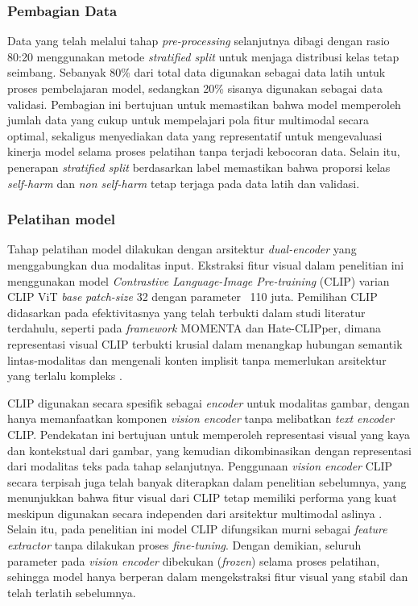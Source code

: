 \subsubsection{Pembagian Data} \label{subsubsec:pembagian_data}
Data yang telah melalui tahap \textit{pre-processing} selanjutnya dibagi dengan rasio 80:20 menggunakan metode \textit{stratified split} untuk menjaga distribusi kelas tetap seimbang. Sebanyak 80\% dari total data digunakan sebagai data latih untuk proses pembelajaran model, sedangkan 20\% sisanya digunakan sebagai data validasi. Pembagian ini bertujuan untuk memastikan bahwa model memperoleh jumlah data yang cukup untuk mempelajari pola fitur multimodal secara optimal, sekaligus menyediakan data yang representatif untuk mengevaluasi kinerja model selama proses pelatihan tanpa terjadi kebocoran data. Selain itu, penerapan \textit{stratified split} berdasarkan label memastikan bahwa proporsi kelas \textit{self-harm} dan \textit{non self-harm} tetap terjaga pada data latih dan validasi.

\subsubsection{Pelatihan model} \label{subsubsec:pelatihan_model}
Tahap pelatihan model dilakukan dengan arsitektur \textit{dual-encoder} yang menggabungkan dua modalitas input. Ekstraksi fitur visual dalam penelitian ini menggunakan model \textit{Contrastive Language-Image Pre-training} (CLIP) varian CLIP ViT \textit{base} \textit{patch-size} 32 dengan parameter ~110 juta. Pemilihan CLIP didasarkan pada efektivitasnya yang telah terbukti dalam studi literatur terdahulu, seperti pada \textit{framework} MOMENTA dan Hate-CLIPper, dimana representasi visual CLIP terbukti krusial dalam menangkap hubungan semantik lintas-modalitas dan mengenali konten implisit tanpa memerlukan arsitektur yang terlalu kompleks \cite{pramanick2021momenta} \cite{kumar2022hateclipper}. 

CLIP digunakan secara spesifik sebagai \textit{encoder} untuk modalitas gambar, dengan hanya memanfaatkan komponen \textit{vision encoder} tanpa melibatkan \textit{text encoder} CLIP. Pendekatan ini bertujuan untuk memperoleh representasi visual yang kaya dan kontekstual dari gambar, yang kemudian dikombinasikan dengan representasi dari modalitas teks pada tahap selanjutnya. Penggunaan \textit{vision encoder} CLIP secara terpisah juga telah banyak diterapkan dalam penelitian sebelumnya, yang menunjukkan bahwa fitur visual dari CLIP tetap memiliki performa yang kuat meskipun digunakan secara independen dari arsitektur multimodal aslinya \cite{gao2021clipadapter}. Selain itu, pada penelitian ini model CLIP difungsikan murni sebagai \textit{feature extractor} tanpa dilakukan proses \textit{fine-tuning}. Dengan demikian, seluruh parameter pada \textit{vision encoder} dibekukan (\textit{frozen}) selama proses pelatihan, sehingga model hanya berperan dalam mengekstraksi fitur visual yang stabil dan telah terlatih sebelumnya.

